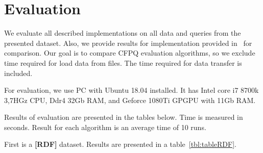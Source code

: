 \section{Evaluation}

We evaluate all described implementations on all data and queries from the presented dataset.
Also, we provide results for implementation provided in~\cite{Azimov:2018:CPQ:3210259.3210264} for comparison.
Our goal is to compare CFPQ evaluation algorithms, so we exclude time required for load data from files.
The time required for data transfer is included.

For evaluation, we use PC with Ubuntu 18.04 installed.
It has Intel core i7 8700k 3,7HGz CPU, Ddr4 32Gb RAM, and Geforce 1080Ti GPGPU with 11Gb RAM.

Results of evaluation are presented in the tables below.
Time is measured in seconds.
Result for each algorithm is an average time of 10 runs.

First is a \textbf{[RDF]} dataset.
Results are presented in a table~\ref{tbl:tableRDF}.


